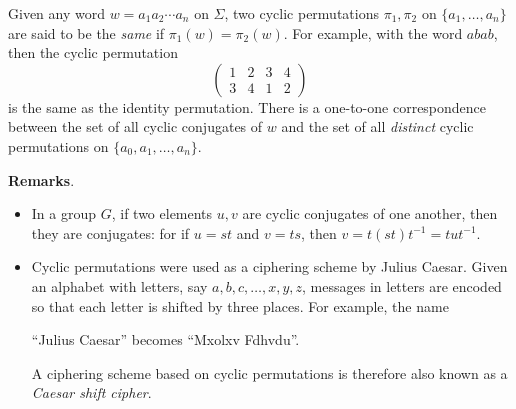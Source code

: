 \documentclass[12pt]{article}
\begin{document}
Given any word $w=a_1a_2\cdots a_n$ on $\Sigma$, two cyclic permutations $\pi_1,\pi_2$ on $\lbrace a_1,\ldots, a_n\rbrace$ are said to be the \emph{same} if $\pi_1(w)=\pi_2(w)$.  For example, with the word $abab$, then the cyclic permutation $$\left( \begin{array}{cccc}
1 & 2 & 3 & 4 \\
3 & 4 & 1 & 2 \end{array} \right)$$ is the same as the identity permutation.  There is a one-to-one correspondence between the set of all cyclic conjugates of $w$ and the set of all \emph{distinct} cyclic permutations on $\lbrace a_0,a_1,\ldots, a_n\rbrace$.

\textbf{Remarks}.
\begin{itemize}
\item
In a group $G$, if two elements $u,v$ are cyclic conjugates of one another, then they are conjugates: for if $u=st$ and $v=ts$, then $v=t(st)t^{-1}=tut^{-1}$.
\item
Cyclic permutations were used as a ciphering scheme by Julius Caesar.  Given an alphabet with letters, say $a,b,c, \ldots,x,y,z$, messages in letters are encoded so that each letter is shifted by three places.  For example, the name 
\begin{center} ``Julius Caesar'' becomes ``Mxolxv Fdhvdu''.\end{center} A ciphering scheme based on cyclic permutations is therefore also known as a \emph{Caesar shift cipher}.
\end{itemize}
\end{document}
